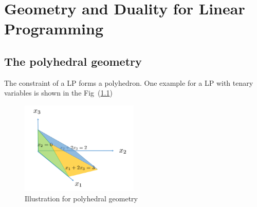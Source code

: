 \chapter{Geometry and Duality for Linear Programming}
\section{The polyhedral geometry}
The constraint of a LP forms a polyhedron. One example for a LP with tenary variables is shown in the Fig~(\ref{fig:2:1})
\begin{figure}
\centering
\includegraphics[width=0.5\textwidth]{Second_lecture/p_1}
\caption{Illustration for polyhedral geometry}
\label{fig:2:1}
\end{figure}

